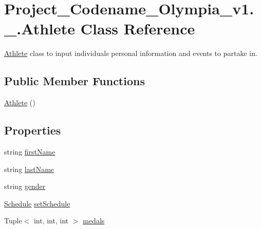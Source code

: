 \hypertarget{classProject__Codename__Olympia__v1_1_1__0_1_1Athlete}{}\section{Project\+\_\+\+Codename\+\_\+\+Olympia\+\_\+v1.\+\_.\+Athlete Class Reference}
\label{classProject__Codename__Olympia__v1_1_1__0_1_1Athlete}


\hyperlink{classProject__Codename__Olympia__v1_1_1__0_1_1Athlete}{Athlete} class to input individual\textquotesingle{}s personal information and events to partake in.  


\subsection*{Public Member Functions}
\begin{DoxyCompactItemize}
\item 
\hyperlink{classProject__Codename__Olympia__v1_1_1__0_1_1Athlete_a9f7a395fab9d43787087a2041a4b7507}{Athlete} ()
\end{DoxyCompactItemize}
\subsection*{Properties}
\begin{DoxyCompactItemize}
\item 
string \hyperlink{classProject__Codename__Olympia__v1_1_1__0_1_1Athlete_a2aff06b4778db2b8c2574b68cfdca6b6}{first\+Name}
\item 
string \hyperlink{classProject__Codename__Olympia__v1_1_1__0_1_1Athlete_a406e55fe8ee98f331effe28eb7d6bd8a}{last\+Name}
\item 
string \hyperlink{classProject__Codename__Olympia__v1_1_1__0_1_1Athlete_af3549b001122e0e0a9bc9cbef7880d5a}{gender}
\item 
\hyperlink{classProject__Codename__Olympia__v1_1_1__0_1_1Schedule}{Schedule} \hyperlink{classProject__Codename__Olympia__v1_1_1__0_1_1Athlete_ac869bba03b1e1fc2a7adb1f6d13ff868}{set\+Schedule}
\item 
Tuple$<$ int, int, int $>$ \hyperlink{classProject__Codename__Olympia__v1_1_1__0_1_1Athlete_a15839d2fe477d5d5fc7fb877ba0bcf56}{medals}
\end{DoxyCompactItemize}


